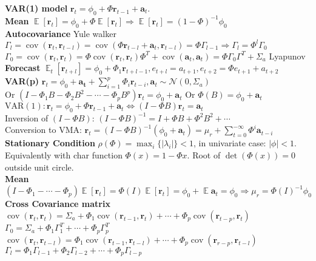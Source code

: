 \documentclass[10pt,landscape, a4paper]{article}
\theoremstyle{remark}
\newcommand{\E}{\operatorname{\mathbb{E}}}
\newcommand{\abs}[1]{\left\lvert #1 \right\rvert}
\newcommand{\cov}[1]{\operatorname{cov}(#1)}
\begin{document}
\begin{multicols*}{3}
\textbf{VAR(1) model} $\bm{r}_t = \phi_0 + \Phi \bm{r}_{t-1} + \bm{a}_t$.\\ 
\textbf{Mean} $\E [\bm{r}_t] = \phi_0 + \Phi \E [\bm{r}_t] \Rightarrow \E [\bm{r}_t] = (1-\Phi)^{-1} \phi_0 $\\
\textbf{Autocovariance} Yule walker $\Gamma_l = \cov{\bm{r}_t, \bm{r}_{t-l}} = \cov{\Phi \bm{r}_{t-l}+\bm{a}_t, \bm{r}_{t-l}} = \Phi \Gamma_{l-1} \Rightarrow \Gamma_l = \Phi^l \Gamma_0$\\
$\Gamma_0 = \cov{\bm{r}_t, \bm{r}_t} = \Phi \cov{\bm{r}_t, \bm{r}_t} \Phi^T + \cov{\bm{a}_t, \bm{a}_t} = \Phi\Gamma_0 \Gamma^T +\Sigma_a $ Lyapunov\\
\textbf{Forecast} $\E_t [\bm{r}_{t+l}] = \phi_0+ \Phi_1 \bm{r}_{t+l-1}, e_{t+l} = a_{t+1}, e_{t+2} = \Phi e_{t+1} + a_{t+2}$\\
\textbf{VAR(p)} $\bm{r}_t = \phi_0 + \bm{a_t} + \sum^p_{i=1} \Phi_i \bm{r}_{t-i}, \bm{a}_t \sim \mathcal{N} (0, \Sigma_a) $\\
Or $(I - \Phi_1 B - \Phi_2 B^2 - \cdots - \Phi_p B^p) \bm{r}_t = \phi_0+\bm{a}_t$ Or $\Phi (B) = \phi_0+\bm{a}_t$\\
$\mathrm{VAR}(1): \bm{r}_t = \phi_0 + \Phi \bm{r}_{t-1} +\bm{a}_t \Leftrightarrow (I - \Phi B)\bm{r}_t = \bm{a}_t$\\
Inversion of $(I - \Phi B)$: $(I - \Phi B)^{-1} = I + \Phi B + \Phi^2 B^2 + \cdots$\\
Conversion to VMA: $\bm{r}_t = (I - \Phi B)^{-1}(\phi_0 + \bm{a}_t) = \mu_r + \sum^{-\infty}_{t=0} \Phi^i \bm{a}_{t-i}$\\
\textbf{Stationary Condition} $\rho(\Phi) = \max_i \{\abs{\lambda_i} \} < 1$, in univariate case: $\abs{\phi} < 1$. Equivalently with char function $\Phi (x) = 1- \Phi x $. Root of $\det (\Phi(x)) = 0$ outside unit circle.\\
\textbf{Mean} $(I - \Phi_1 - \cdots - \Phi_p) \E[\bm{r}_t] = \Phi (I) \E[\bm{r}_t] = \phi_0 +\E \bm{a}_t = \phi_0 \Rightarrow \mu_r = \Phi(I)^{-1} \phi_0 $\\
\textbf{Cross Covariance matrix} $\cov{\bm{r}_t, \bm{r}_t} = \Sigma_a + \Phi_1 \cov{\bm{r}_{t-1}, \bm{r}_t} + \cdots + \Phi_p \cov{\bm{r}_{t-p}, \bm{r}_t} $\\
$\Gamma_0 = \Sigma_a + \Phi_1 \Gamma^T_1 + \cdots + \Phi_p \Gamma^T_p$\\
$\cov{\bm{r}_t, \bm{r}_{t-l}} = \Phi_1 \cov{\bm{r}_{t-1}, \bm{r}_{t-l}} + \cdots + \Phi_p \cov{\bm{r}_{r-p}, \bm{r}_{t-l}} $\\
$\Gamma_l = \Phi_1 \Gamma_{l-1} +\Phi_2 \Gamma_{l-2} + \cdots + \Phi_p \Gamma_{l-p} $\\


\end{multicols*}
\end{document}
